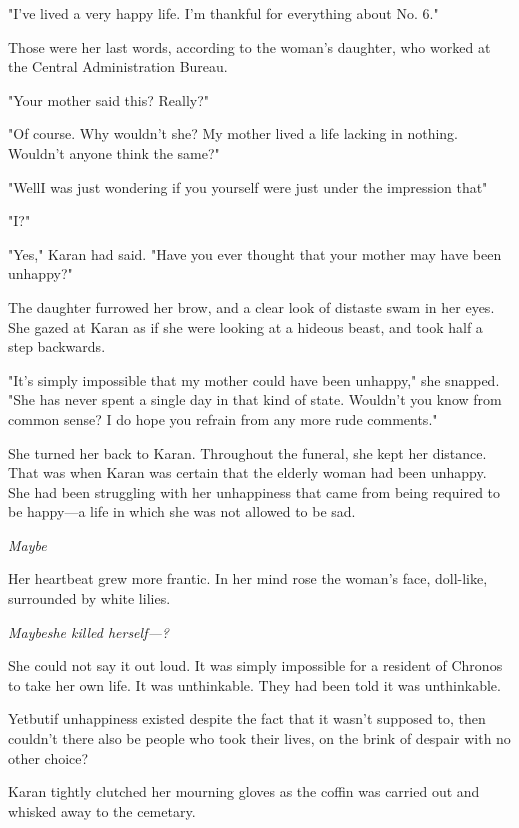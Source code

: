 "I've lived a very happy life. I'm thankful for everything about No. 6."

Those were her last words, according to the woman's daughter, who worked
at the Central Administration Bureau.


"Your mother said this? Really?"

"Of course. Why wouldn't she? My mother lived a life lacking in nothing.
Wouldn't anyone think the same?"

"Well\el I was just wondering if you yourself were just under the
impression that\el "

"I?"

"Yes," Karan had said. "Have you ever thought that your mother may have
been unhappy?"

The daughter furrowed her brow, and a clear look of distaste swam in her
eyes. She gazed at Karan as if she were looking at a hideous beast, and
took half a step backwards.

"It's simply impossible that my mother could have been unhappy," she
snapped. "She has never spent a single day in that kind of state.
Wouldn't you know from common sense? I do hope you refrain from any more
rude comments."

She turned her back to Karan. Throughout the funeral, she kept her
distance. That was when Karan was certain that the elderly woman had
been unhappy. She had been struggling with her unhappiness that came
from being required to be happy---a life in which she was not allowed to
be sad.

\emph{Maybe\el }

Her heartbeat grew more frantic. In her mind rose the woman's face,
doll-like, surrounded by white lilies.

\emph{Maybe\el she killed herself---?}

She could not say it out loud. It was simply impossible for a resident
of Chronos to take her own life. It was unthinkable. They had been told
it was unthinkable.

Yet\el but\el if unhappiness existed despite the fact that it wasn't
supposed to, then couldn't there also be people who took their lives, on
the brink of despair with no other choice?

Karan tightly clutched her mourning gloves as the coffin was carried out
and whisked away to the cemetary.

